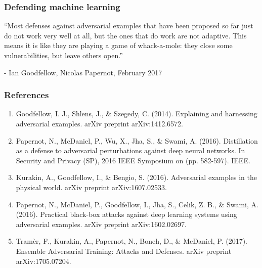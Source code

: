 \documentclass[9pt]{beamer}
\begin{document}
\begin{frame}

  \frametitle{Defending machine learning}

  ``Most defenses against adversarial examples that have been proposed
  so far just do not work very well at all, but the ones that do work
  are not adaptive. This means it is like they are playing a game of
  whack-a-mole: they close some vulnerabilities, but leave others
  open.''

  \bigskip

  - Ian Goodfellow, Nicolas Papernot, February 2017
\end{frame}

\begin{frame}
  \frametitle{References}

  {\footnotesize
    \begin{enumerate}
    \item Goodfellow, I. J., Shlens, J., \& Szegedy,
      C. (2014). Explaining and harnessing adversarial
      examples. arXiv preprint arXiv:1412.6572.
    \item Papernot, N., McDaniel, P., Wu, X., Jha, S., \& Swami,
      A. (2016). Distillation as a defense to adversarial
      perturbations against deep neural networks. In Security and
      Privacy (SP), 2016 IEEE Symposium on (pp. 582-597). IEEE.
    \item Kurakin, A., Goodfellow, I., \& Bengio,
      S. (2016). Adversarial examples in the physical world. arXiv
      preprint arXiv:1607.02533.
    \item Papernot, N., McDaniel, P., Goodfellow, I., Jha, S., Celik,
      Z. B., \& Swami, A. (2016). Practical black-box attacks against
      deep learning systems using adversarial examples. arXiv preprint
      arXiv:1602.02697.
    \item Tramèr, F., Kurakin, A., Papernot, N., Boneh, D., \&
      McDaniel, P. (2017). Ensemble Adversarial Training: Attacks and
      Defenses. arXiv preprint arXiv:1705.07204.
    \end{enumerate}
  }

\end{frame}
\end{document}
